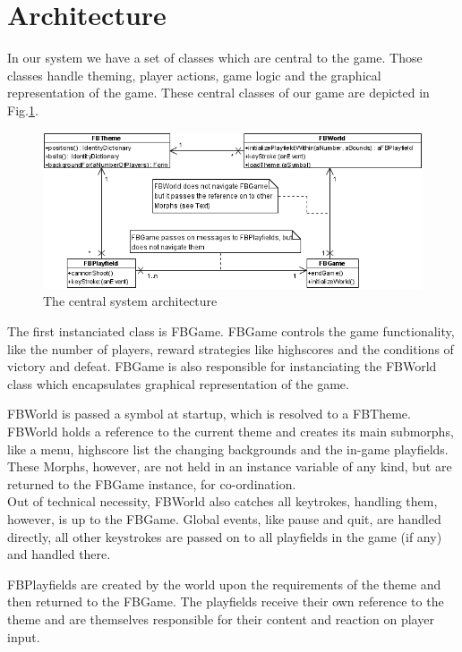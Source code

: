 \section{Architecture}
In our system we have a set of classes which are central to the 
game. Those classes handle theming, player actions, game logic 
and the graphical representation of the game. These central
classes of our game are depicted in Fig.\ref{fig:architecture}.
%
\begin{figure}[tbh]
  \begin{center}
    \includegraphics{images/architecture.png}
  \end{center}
  \caption{The central system architecture}
  \label{fig:architecture}
\end{figure}
%
The first instanciated class is FBGame. FBGame controls the game functionality, 
like the number of players, reward strategies like highscores and the
conditions of victory and defeat. FBGame is also responsible for instanciating
the FBWorld class which encapsulates graphical representation of the game.

FBWorld is passed a symbol at startup, which is resolved to a FBTheme. FBWorld 
holds a reference to the current theme and creates its main submorphs, like
a menu, highscore list the changing backgrounds and the in-game playfields.
These Morphs, however, are not held in an instance variable of any kind, but 
are returned to the FBGame instance, for co-ordination.\\
Out of technical necessity, FBWorld also catches all keytrokes, handling them, 
however, is up to the FBGame. Global events, like pause and quit, are handled 
directly, all other keystrokes are passed on to all playfields in the game (if any)
and handled there.

FBPlayfields are created by the world upon the requirements of the theme
and then returned to the FBGame. The playfields receive their own reference 
to the theme and are themselves responsible for their content and reaction on 
player input.


